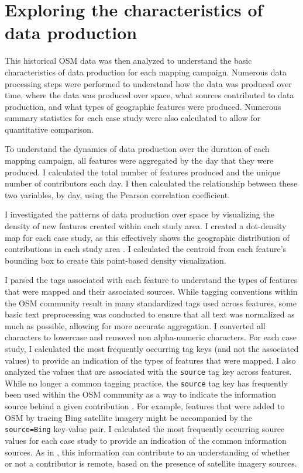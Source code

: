 \section{Exploring the characteristics of data production}
\label{sec-production}

This historical OSM data was then analyzed to understand the basic characteristics of data production for each mapping campaign. Numerous data processing steps were performed to understand how the data was produced over time, where the data was produced over space, what sources contributed to data production, and what types of geographic features were produced. Numerous summary statistics for each case study were also calculated to allow for quantitative comparison.

To understand the dynamics of data production over the duration of each mapping campaign, all features were aggregated by the day that they were produced. I calculated the total number of features produced and the unique number of contributors each day. I then calculated the relationship between these two variables, by day, using the Pearson correlation coefficient. 

I investigated the patterns of data production over space by visualizing the density of new features created within each study area. I created a dot-density map for each case study, as this effectively shows the geographic distribution of contributions in each study area \parencite{kimerling_dotting_2009}. I calculated the centroid from each feature's bounding box to create this point-based density visualization. 

I parsed the tags associated with each feature to understand the types of features that were mapped and their associated sources. While tagging conventions within the OSM community result in many standardized tags used across features, some basic text preprocessing was conducted to ensure that all text was normalized as much as possible, allowing for more accurate aggregation. I converted all characters to lowercase and removed non alpha-numeric characters. For each case study, I calculated the most frequently occurring tag keys (and not the associated values) to provide an indication of the types of features that were mapped. I also analyzed the values that are associated with the \texttt{source} tag key across features. While no longer a common tagging practice, the \texttt{source} tag key has frequently been used within the OSM community as a way to indicate the information source behind a given contribution \parencite{openstreetmap_wiki_keysource_2020}. For example, features that were added to OSM by tracing Bing satellite imagery might be accompanied by the \texttt{source=Bing} key-value pair. I calculated the most frequently occurring source values for each case study to provide an indication of the common information sources. As in \textcite{ahmouda_analyzing_2018}, this information can contribute to an understanding of whether or not a contributor is remote, based on the presence of satellite imagery sources.  

